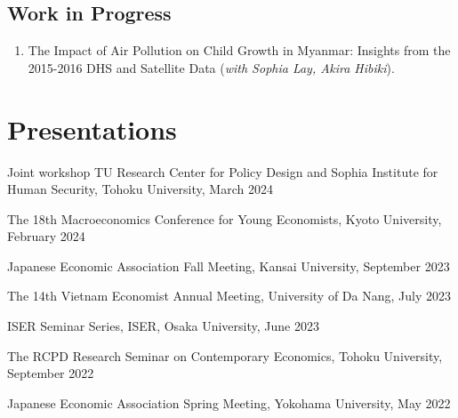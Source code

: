 \documentclass[12pt]{article}
\begin{document}
\subsection{Work in Progress}

\begin{enumerate}[resume*] 

\item The Impact of Air Pollution on Child Growth in Myanmar: Insights from the 2015-2016 DHS and Satellite Data (\textit{with Sophia Lay, Akira Hibiki}).

\end{enumerate}



\section{Presentations}

\begin{enumerate}[label={[\arabic*]}]
\item Joint workshop TU Research Center for Policy Design and Sophia Institute for Human Security, Tohoku University, March 2024
\item The 18th Macroeconomics Conference for Young Economists, Kyoto University, February 2024
\item Japanese Economic Association Fall Meeting, Kansai University, September 2023
\item The 14th Vietnam Economist Annual Meeting, University of Da Nang, July 2023
\item ISER Seminar Series, ISER, Osaka University, June 2023
\item The RCPD Research Seminar on Contemporary Economics, Tohoku University, September 2022
\item Japanese Economic Association Spring Meeting, Yokohama University, May 2022
\end{enumerate}

%
%
%
%
%
\end{document}

